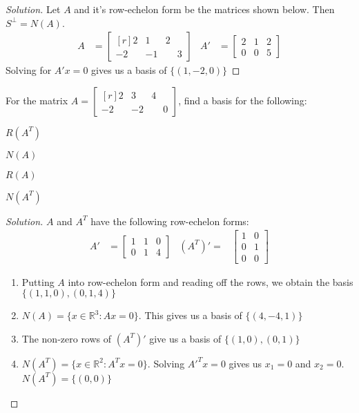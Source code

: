 \documentclass[crop=false,class=book,oneside]{standalone}                      %
\begin{document}
        \begin{proof}[Solution]
        Let $A$ and it's row-echelon form be the matrices shown below. Then $S^{\perp} = N(A)$.
        \begin{align*}
            A&=\begin{bmatrix*}[r] 2 & 1 & 2 \\ -2 & -1 & \phantom{-}3\end{bmatrix*} & A'&=\begin{bmatrix} 2 & 1 & 2 \\ 0 & 0 & 5 \end{bmatrix}
        \end{align*}
        Solving for $A'x = 0$ gives us a basis of $\{(1,-2,0)\}$
        \end{proof}
        \begin{problem}
        For the matrix $A = \begin{bmatrix*}[r] 2 & 3 & 4 \\ -2 & -2 & \phantom{-}0 \end{bmatrix*}$, find a basis for the following:
        \begin{enumerate}
        \begin{multicols}{4}
            \item $R(A^T)$
            \item $N(A)$
            \item $R(A)$
            \item $N(A^T)$
        \end{multicols}
        \end{enumerate}
        \end{problem}
        \begin{proof}[Solution]
        $A$ and $A^{T}$ have the following row-echelon forms:
        \begin{align*}
            A'&=\begin{bmatrix}1&1&0\\0&1&4\end{bmatrix} & (A^{T})'=&\begin{bmatrix}1&0\\0&1\\0&0\end{bmatrix}
        \end{align*}
        \begin{enumerate}
            \item Putting $A$ into row-echelon  form and reading off the rows, we obtain the basis $\{(1,1,0),(0,1,4)\}$
            \item $N(A) = \{x\in \mathbb{R}^3:  Ax = 0\}$. This gives us a basis of $\{(4,-4,1)\}$
            \item The non-zero rows of $(A^{T})'$ give us a basis of $\{(1,0),(0,1)\}$
            \item $N(A^T) = \{x\in \mathbb{R}^2: A^Tx = 0\}$. Solving $A'^{T}x=0$ gives us $x_1 = 0$ and $x_2 = 0$. $N(A^T) = \{(0,0)\}$
        \end{enumerate}
        \end{proof}
\end{document}
